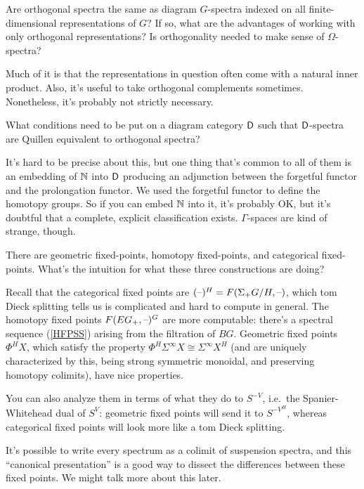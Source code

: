 \begin{ques}
Are orthogonal spectra the same as diagram $G$-spectra indexed on all finite-dimensional representations of $G$? If
so, what are the advantages of working with only orthogonal representations? Is orthogonality needed to make sense
of $\Omega$-spectra?
\end{ques}
Much of it is that the representations in question often come with a natural inner product. Also, it's useful to
take orthogonal complements sometimes. Nonetheless, it's probably not strictly necessary.
\begin{ques}
What conditions need to be put on a diagram category $\mathsf D$ such that $\mathsf D$-spectra are Quillen equivalent to
orthogonal spectra?
\end{ques}
It's hard to be precise about this, but one thing that's common to all of them is an embedding of $\mathbb N$ into $\mathsf D$
producing an adjunction between the forgetful functor and the prolongation functor. We used the forgetful functor
to define the homotopy groups. So if you can embed $\mathbb N$ into it, it's probably OK, but it's doubtful that a
complete, explicit classification exists. $\Gamma$-spaces are kind of strange, though.
\begin{ques}
There are geometric fixed-points, homotopy fixed-points, and categorical fixed-points. What's the intuition for
what these three constructions are doing?
\end{ques}
Recall that the categorical fixed points are $(\text{--})^H = F(\Sigma_+ G/H,\text{--})$, which tom Dieck splitting tells us is
complicated and hard to compute in general. The homotopy fixed points $F(EG_+,\text{--})^G$ are more computable: there's
a spectral sequence (\cref{HFPSS}) arising from the filtration of $BG$. Geometric fixed points $\Phi^HX$, which
satisfy the property $\Phi^H\Sigma^\infty X \cong \Sigma^\infty X^H$ (and are uniquely characterized by this, being
strong symmetric monoidal, and preserving homotopy colimits), have nice properties.

You can also analyze them in terms of what they do to $S^{-V}$, i.e.\ the Spanier-Whitehead dual of $S^V$:
geometric fixed points will send it to $S^{-V^H}$, whereas categorical fixed points will look more like a tom Dieck
splitting.

It's possible to write every spectrum as a colimit of suspension spectra, and this ``canonical presentation'' is a
good way to dissect the differences between these fixed points. We might talk more about this later.

